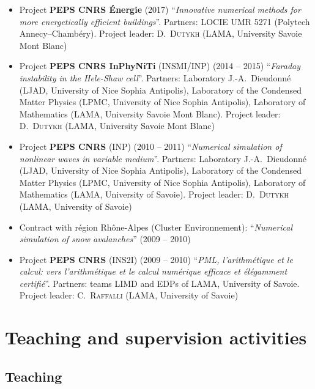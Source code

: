 \documentclass[final, a4paper, oneside, 12pt]{article}
\numberwithin{equation}{section}
\begin{document}
\begin{itemize}

  \item Project \textbf{PEPS CNRS \'Energie} (2017) ``\textit{Innovative numerical methods for more energetically efficient buildings}''. Partners: LOCIE UMR 5271 (Polytech Annecy--Chamb\'ery). Project leader: D.~\textsc{Dutykh} (LAMA, University Savoie Mont Blanc)

  \item Project \textbf{PEPS CNRS InPhyNiTi} (INSMI/INP) (2014 -- 2015) ``\textit{Faraday instability in  the Hele-Shaw cell}''. Partners: Laboratory J.-A.~Dieudonn\'e (LJAD, University of Nice Sophia Antipolis), Laboratory of the Condensed Matter Physics (LPMC, University of Nice Sophia Antipolis), Laboratory of Mathematics (LAMA, University Savoie Mont Blanc). Project leader: D.~\textsc{Dutykh} (LAMA, University Savoie Mont Blanc)
  
  \item Project \textbf{PEPS CNRS} (INP) (2010 -- 2011) ``\textit{Numerical simulation of nonlinear waves in variable medium}''. Partners: Laboratory J.-A.~Dieudonn\'e (LJAD, University of Nice Sophia Antipolis), Laboratory of the Condensed Matter Physics (LPMC, University of Nice Sophia Antipolis), Laboratory of Mathematics (LAMA, University of Savoie). Project leader: D.~\textsc{Dutykh} (LAMA, University of Savoie)

  \item Contract with r\'egion Rh\^one-Alpes (Cluster Environnement): ``\textit{Numerical simulation of snow avalanches}'' (2009 -- 2010)
  
  \item Project \textbf{PEPS CNRS} (INS2I) (2009 -- 2010) ``\textit{PML, l'arithm\'etique et le calcul: vers l'arithm\'etique et le calcul num\'erique efficace et \'el\'egamment certifi\'e}''. Partners: teams LIMD and EDPs of LAMA, University of Savoie. Project leader: C.~\textsc{Raffalli} (LAMA, University of Savoie)

\end{itemize}

\section{Teaching and supervision activities}

\subsection{Teaching}
\end{document}
